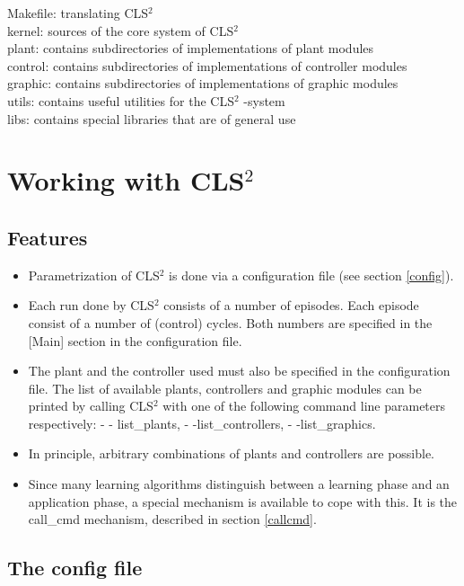 \documentclass[a4paper,12pt,german]{article}
\newcommand{\cls}{{CLS$^2$ }}
\newcommand{\clsquare}{{CLS$^2$ }}
\newcommand{\ite}{\begin{itemize}}
\newcommand{\eti}{\end{itemize}}
\begin{document}
Makefile: translating \cls\\
kernel: sources of the core system of \cls\\
plant: contains subdirectories of implementations of plant modules\\
control: contains subdirectories of implementations of controller modules\\
graphic: contains subdirectories of implementations of graphic modules\\
utils: contains useful utilities for the \cls-system\\
libs: contains special libraries that are of general use






\section{Working with \clsquare}

\subsection{Features}


\ite
\item Parametrization of \cls is done via a configuration file (see section \ref{config}).
\item Each run done by \cls consists of a number of episodes. Each episode consist of a number of (control) cycles.
Both numbers are specified in the [Main] section in the configuration file.
\item The plant and the controller used must also be specified in the configuration file.
The list of available plants, controllers and graphic modules can be printed by calling
\cls with one of the following command line parameters respectively: - - list\_plants, - -list\_controllers, - -list\_graphics.
\item In principle, arbitrary combinations of plants and controllers are possible.
\item Since many learning algorithms distinguish between a learning phase and an application
phase, a special mechanism is available to cope with this. It is the call\_cmd mechanism,
described in section \ref{callcmd}.
\eti


\subsection{The config file \label{config}}
\end{document}
